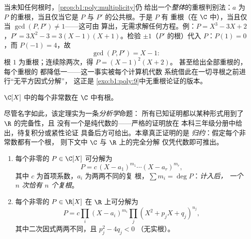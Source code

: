 \begin{example}[用最大公因数检测重根]\label{ex:b1:poly:gcdmultiple}
当未知任何根时，\cref{prop:b1:poly:multiplicity}仍
给出一个\emph{整体}的重根判别法：$a$ 为
$P$ 的重根，当且仅当它是 $P$ 与 $P'$ 的公共根。于是 $P$ 有
重根（在 $\C$ 中），当且仅当 $\gcd(P, P') \neq 1$——这可由
算出，无需求解任何方程。例：$P =
X^3 - 3X + 2$，$P' = 3X^2 - 3 = 3(X - 1)(X + 1)$。检验
$\pm1$（$P'$ 的根）代入 $P$：$P(1) = 0$，而 $P(-1) = 4$，故
\[
\gcd(P, P') = X - 1 :
\]
根 $1$ 为重根；连续除两次，得 $P = (X - 1)^2(X + 2)$。
甚至给出全部重根的，每个重根的
都降低一——这一事实被每个计算机代数
系统借此在一切寻根之前进行“无平方因式分解”，
这正是
\cref{exo:b1:poly:9}中无重根论证的版本。
\end{example}

\begin{theorem}[代数基本定理]\label{thm:b1:poly:fta}
$\C[X]$ 中的每个非常数在
$\C$ 中有根。
\end{theorem}
\admitted

\begin{remark}
尽管名字如此，该定理实为一条\emph{分析学}命题：
所有已知证明都以某种形式用到了 $\R$ 的完备性，且
没有一个是纯代数的——严格的证明放在
本科三年级分册中给出，待复积分或紧性论证
具备后方可给出。本章真正证明的是
\emph{归约}：假定每个非常数都有一个根，
则下文中 $\C$ 与 $\R$ 上的完全分解
仅凭代数即可推出。
\end{remark}

\begin{corollary}[$\C$ 与 $\R$ 上的因式分解]\label{cor:b1:poly:factorization}
\begin{enumerate}
  \item 每个非零的 $P \in \C[X]$ 可分解为
        \[
        P = c\, (X - a_1)^{m_1} \cdots (X - a_r)^{m_r},
        \]
        其中 $c$ 为首项系数，$a_i$ 为两两不同的复
        根，$\sum m_i = \deg P$：\emph{计入后，
        一个 $n$ 次恰有 $n$ 个复根}。
  \item 每个非零的 $P \in \R[X]$ 在 $\R$ 上可分解为
        \[
        P = c \prod_i (X - a_i)^{m_i} \prod_j (X^2 + p_j X +
        q_j)^{n_j},
        \]
        其中二次因式两两不同，且 $p_j^2 - 4q_j < 0$
        （无实根）。
\end{enumerate}
\end{corollary}

